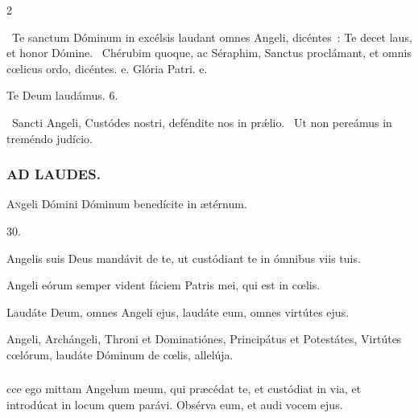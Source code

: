 \documentclass[9pt,twoside]{extarticle}
\begin{document}
\begin{multicols}{2}
{\begin{tightlist}{}
\item {}~Te sanctum Dóminum in excélsis laudant omnes Angeli, dicéntes~: \textred{*} Te decet laus, et honor Dómine. ~Chérubim quoque, ac Séraphim, Sanctus proclámant, et omnis cœlicus ordo, dicéntes. e. Glória Patri. e.
\item Te Deum laudámus. 6.
\item {}~Sancti Angeli, Custódes nostri, deféndite nos in prǽlio. ~Ut non pereámus in treméndo judício.
\end{tightlist}

\subsubsection*{\center \textsc{AD LAUDES.}}
\begin{center}\end{center}
\lettrine{A}ngeli Dómini Dóminum benedícite in ætérnum.

\begin{tightlist}{}
\item {} 30.
\item {} Angelis suis Deus mandávit de te, ut custódiant te in ómnibus viis tuis.
\item {} Angeli eórum semper vident fáciem Patris mei, qui est in cœlis.
\item {} Laudáte Deum, omnes Angeli ejus, laudáte eum, omnes virtútes ejus.
\item {} Angeli, Archángeli, Throni et Dominatiónes, Principátus et Potestátes, Virtútes cœlórum, laudáte Dóminum de cœlis, allelúja.
\end{tightlist}

\subsubsection*{}
cce ego mittam Angelum meum, qui præcédat te, et custódiat in via, et introdúcat in locum quem parávi. Obsérva eum, et audi vocem ejus.

}
\end{multicols}
\end{document}
